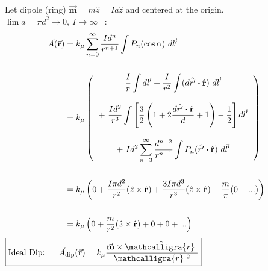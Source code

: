 \documentclass[12pt]{article}
\newcommand{\bfr}{\mathbf{r}}
\newcommand{\scripty}[1]{\ensuremath{\mathcalligra{#1}}}
\newcommand{\cursrr}{\scripty{r}\ }
\newcommand{\dotP}{\boldsymbol \cdot}		%
\begin{document}
\begin{minipage}[t]{0.48\textwidth}
	Let dipole (ring) \( \vec{ \mathbf{m} } = m \hat{z} = Ia \hat{z} \) and centered at the origin. \\[15pt]
	\(\lim a = \pi d^2 \rightarrow 0, \ I \rightarrow \infty \) \ :
	\begin{align*}
		\vec{A}( \vec{ \mathbf{r} } ) &= k_\mu \sum_{n=0}^\infty 
			\frac{Id^n}{r^{n+1}} \int P_n (\cos{\alpha}) \ d\vec{l'}\\ \\
		&= k_\mu \left( 
				\begin{tabular}{c}
					\( \displaystyle \frac{I}{r} \int d\vec{l}' 
						+ \frac{I}{r^2} \int ( d \hat{r'} \dotP \hat{\bfr} ) \ d\vec{l}' \) \\ \\
					\( \displaystyle + \ \frac{Id^2}{r^3} \int 
						\left[ \frac{3}{2} \left( 1 + 2 \frac{d \hat{r'} \dotP \hat{\bfr}}{d} + 1 \right) 
						- \frac{1}{2} \right] d\vec{l}' \) \\ \\ 
					\( \displaystyle + \ I d^2 \sum_{n=3}^\infty \frac{d^{n-2}}{r^{n+1}} \int P_n (\hat{r'} \dotP \hat{\bfr}) \ d\vec{l}' \)	
				\end{tabular} 
			\right) \\ \\
		&= k_\mu \left( 0
			+ \frac{I \pi d^2}{r^2} ( \hat{z} \times \hat{\bfr} )
			+ \frac{3 I \pi d^3}{r^3} ( \hat{z} \times \hat{\bfr} )
			+ \frac{m}{\pi} (0 + ...) \right)\\ \\
		&= k_\mu \left( 0
			+ \frac{m}{r^2} ( \hat{z} \times \hat{\bfr} )
			+ 0 + 0 + ... \right)
	\end{align*}
	\hfill \break
	\( \boxed{ \text{Ideal Dip:} \ \ \ \ \ \vec{A}_{ \text{dip} }( \vec{ \mathbf{r} } ) 
		= k_\mu \frac{ \vec{ \mathbf{m} } \times \hat{\cursrr} }{\cursrr^{2}} } \)
\end{minipage}

\end{document}
